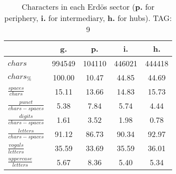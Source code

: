 \begin{table}[h!]
\begin{center}
\begin{tabular}{| l | c | c | c | c |}\hline
 & g. & p. & i. & h. \\\hline
$chars$ & 994549  & 104110  & 446021  & 444418 \\\hline
$chars_{\%}$ & 100.00  & 10.47  & 44.85  & 44.69 \\\hline
$\frac{spaces}{chars}$ & 15.11  & 13.66  & 14.83  & 15.73 \\\hline
$\frac{punct}{chars-spaces}$ & 5.38  & 7.84  & 5.74  & 4.44 \\\hline
$\frac{digits}{chars-spaces}$ & 1.61  & 3.52  & 1.98  & 0.78 \\\hline
$\frac{letters}{chars-spaces}$ & 91.12  & 86.73  & 90.34  & 92.97 \\\hline
$\frac{vogals}{letters}$ & 35.59  & 33.69  & 35.59  & 36.01 \\\hline
$\frac{uppercase}{letters}$ & 5.67  & 8.36  & 5.40  & 5.34 \\\hline
\end{tabular}
\caption{Characters in each Erd\"os sector ({{\bf p.}} for periphery, {{\bf i.}} for intermediary, 
    {{\bf h.}} for hubs). TAG: 9}
\end{center}
\end{table}